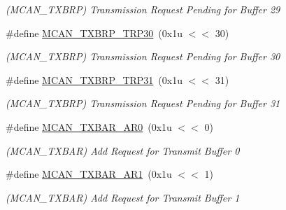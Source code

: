 \begin{DoxyCompactItemize}
\begin{DoxyCompactList}\small\item\em (M\+C\+A\+N\+\_\+\+T\+X\+B\+RP) Transmission Request Pending for Buffer 29 \end{DoxyCompactList}\item 
\mbox{\label{group__SAMV71__MCAN_gabcc5a8cfa809d61c939e27365ccb80f8}} 
\#define \mbox{\hyperlink{group__SAMV71__MCAN_gabcc5a8cfa809d61c939e27365ccb80f8}{M\+C\+A\+N\+\_\+\+T\+X\+B\+R\+P\+\_\+\+T\+R\+P30}}~(0x1u $<$$<$ 30)
\begin{DoxyCompactList}\small\item\em (M\+C\+A\+N\+\_\+\+T\+X\+B\+RP) Transmission Request Pending for Buffer 30 \end{DoxyCompactList}\item 
\mbox{\label{group__SAMV71__MCAN_ga8b5696b10b0dd2c80f602044b172feff}} 
\#define \mbox{\hyperlink{group__SAMV71__MCAN_ga8b5696b10b0dd2c80f602044b172feff}{M\+C\+A\+N\+\_\+\+T\+X\+B\+R\+P\+\_\+\+T\+R\+P31}}~(0x1u $<$$<$ 31)
\begin{DoxyCompactList}\small\item\em (M\+C\+A\+N\+\_\+\+T\+X\+B\+RP) Transmission Request Pending for Buffer 31 \end{DoxyCompactList}\item 
\mbox{\label{group__SAMV71__MCAN_ga0bb882b6334c513e38199652ab64b487}} 
\#define \mbox{\hyperlink{group__SAMV71__MCAN_ga0bb882b6334c513e38199652ab64b487}{M\+C\+A\+N\+\_\+\+T\+X\+B\+A\+R\+\_\+\+A\+R0}}~(0x1u $<$$<$ 0)
\begin{DoxyCompactList}\small\item\em (M\+C\+A\+N\+\_\+\+T\+X\+B\+AR) Add Request for Transmit Buffer 0 \end{DoxyCompactList}\item 
\mbox{\label{group__SAMV71__MCAN_ga7fedba40178069216312e7dd4a3f948e}} 
\#define \mbox{\hyperlink{group__SAMV71__MCAN_ga7fedba40178069216312e7dd4a3f948e}{M\+C\+A\+N\+\_\+\+T\+X\+B\+A\+R\+\_\+\+A\+R1}}~(0x1u $<$$<$ 1)
\begin{DoxyCompactList}\small\item\em (M\+C\+A\+N\+\_\+\+T\+X\+B\+AR) Add Request for Transmit Buffer 1 \end{DoxyCompactList}\item 

\end{DoxyCompactItemize}
